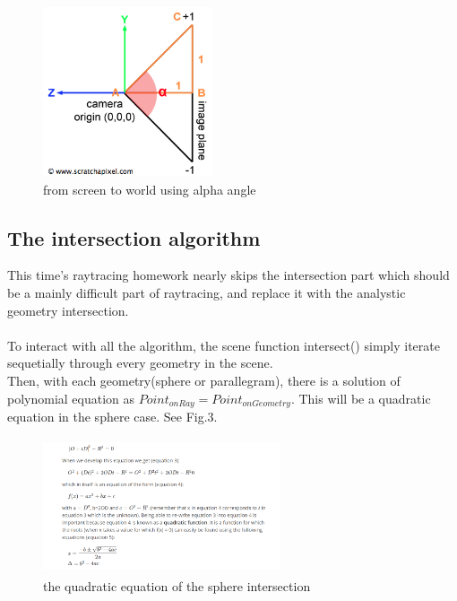 \documentclass[acmtog]{acmart}
\begin{document}
	\begin{figure}[h]
		\centering
		\includegraphics[width=5cm,height=5cm]{camprofile.png}
		\caption{from screen to world using alpha angle}
	\end{figure}
	
	
\subsection{The intersection algorithm}
\quad This time's raytracing homework nearly skips the intersection part which should be a mainly difficult part of raytracing, and replace it with the analystic geometry intersection.\\\\
\quad To interact with all the algorithm, the scene function intersect() simply iterate sequetially through every geometry in the scene.\\
\quad Then, with each geometry(sphere or parallegram), there is a solution of polynomial equation as $Point_{onRay}=Point_{onGeometry}$. This will be a quadratic equation in the sphere case. See Fig.3.
	\begin{figure}[h]
		\centering
		\includegraphics[width=7cm,height=4cm]{solve.png}
		\caption{the quadratic equation of the sphere intersection}
	\end{figure}
\end{document}

